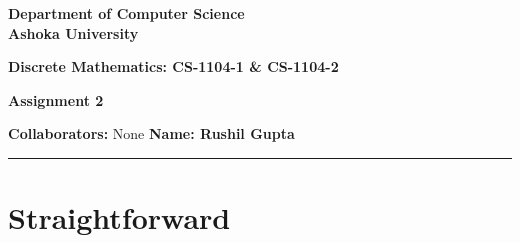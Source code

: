 \documentclass[a4paper]{article}
\begin{document}
\begin{center}
{\large \bf \color{red}  Department of Computer Science} \\
{\large \bf \color{red}  Ashoka University} \\

\vspace{0.1in}

{\large \bf \color{blue}  Discrete Mathematics: CS-1104-1 \& CS-1104-2}

\vspace{0.05in}

    { \bf \color{YellowOrange} Assignment 2}
\end{center}
\medskip

{\textbf{Collaborators:} None} \hfill {\textbf{Name: Rushil Gupta} }

\bigskip
\hrule




\section{Straightforward}
\end{document}
